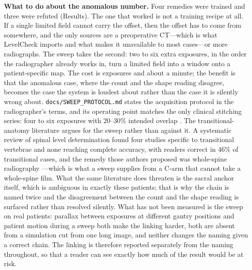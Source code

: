 \documentclass[11pt,letterpaper]{article}
\begin{document}
\textbf{What to do about the anomalous number.} Four remedies were trained and three were refuted (Results). The one that worked is not a training recipe at all. If a single limited field cannot carry the offset, then the offset has to come from somewhere, and the only sources are a preoperative CT---which is what LevelCheck imports and what makes it unavailable to most cases---or more radiographs. The sweep takes the second: two to six extra exposures, in the order the radiographer already works in, turn a limited field into a window onto a patient-specific map. The cost is exposures and about a minute; the benefit is that the anomalous case, where the count and the shape reading disagree, becomes the case the system is loudest about rather than the case it is silently wrong about. \texttt{docs/SWEEP\_PROTOCOL.md} states the acquisition protocol in the radiographer's terms, and its operating point matches the only clinical stitching series: four to six exposures with 20--30\% intended overlap \citep{sxstitch2024}. The transitional-anatomy literature argues for the sweep rather than against it. A systematic review of spinal level determination found four studies specific to transitional vertebrae and none reaching complete accuracy, with readers correct in 46\% of transitional cases, and the remedy those authors proposed was whole-spine radiography \citep{liebrand2026}---which is what a sweep supplies from a C-arm that cannot take a whole-spine film. What the same literature does threaten is the sacral anchor itself, which is ambiguous in exactly these patients; that is why the chain is named twice and the disagreement between the count and the shape reading is surfaced rather than resolved silently. What has not been measured is the sweep on real patients: parallax between exposures at different gantry positions and patient motion during a sweep both make the linking harder, both are absent from a simulation cut from one long image, and neither changes the naming given a correct chain. The linking is therefore reported separately from the naming throughout, so that a reader can see exactly how much of the result would be at risk.
\end{document}
